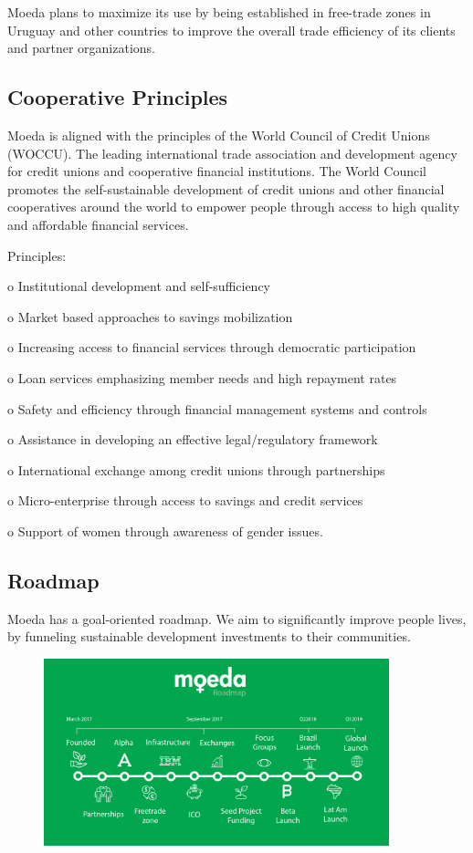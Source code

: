 \documentclass{article}
\begin{document}
Moeda plans to maximize its use by being established in free-trade zones in Uruguay and other countries to improve the overall trade efficiency of its clients and partner organizations.


\subsection{Cooperative Principles}
Moeda is aligned with the principles of the World Council of Credit Unions (WOCCU). The leading international trade association and development agency for credit unions and cooperative financial institutions. The World Council promotes the self-sustainable development of credit unions and other financial cooperatives around the world to empower people through access to high quality and affordable financial services.

Principles:

o	Institutional development and self-sufficiency

o	Market based approaches to savings mobilization

o	Increasing access to financial services through democratic participation

o	Loan services emphasizing member needs and high repayment rates

o	Safety and efficiency through financial management systems and controls

o	Assistance in developing an effective legal/regulatory framework

o	International exchange among credit unions through partnerships

o	Micro-enterprise through access to savings and credit services

o	Support of women through awareness of gender issues. 

\subsection {Roadmap}

Moeda has a goal-oriented roadmap. We aim to significantly improve people lives, by funneling sustainable development investments to their communities.

\begin{figure}[h]
    \centering
    \includegraphics[width=10cm,keepaspectratio]{roadmap}
\end{figure}
\end{document}
